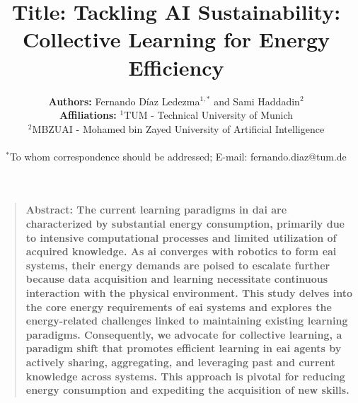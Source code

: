 \documentclass[12pt]{article}
\title{\textbf{Title:} Tackling AI Sustainability: Collective Learning for Energy Efficiency}
\author
{\textbf{Authors:} Fernando D\'iaz Ledezma$ {}^{1,\ast}$ and Sami Haddadin${}^{2}$
	\\
	\normalsize{\textbf{Affiliations:} \normalsize{${}^{1}$TUM - Technical University of Munich}}\\
	\normalsize{${}^{2}$MBZUAI - Mohamed bin Zayed University of Artificial Intelligence}\\
	\\
	\normalsize{$^\ast$To whom correspondence should be addressed; E-mail: fernando.diaz@tum.de}
}
\date{}
\newenvironment{sciabstract}{%
\begin{quote} \bf}
{\end{quote}}
\begin{document}
 

\baselineskip24pt


\maketitle 



\begin{sciabstract}
	\textbf{Abstract:} %
	The current learning paradigms in \ac{dai} are characterized by substantial energy consumption, primarily due to intensive computational processes and limited utilization of acquired knowledge. As \ac{ai} converges with robotics to form \ac{eai} systems, their energy demands are poised to escalate further because data acquisition and learning necessitate continuous interaction with the physical environment. This study delves into the core energy requirements of \ac{eai} systems and explores the energy-related challenges linked to maintaining existing learning paradigms. Consequently, we advocate for collective learning, a paradigm shift that promotes efficient learning in \ac{eai} agents by actively sharing, aggregating, and leveraging past and current knowledge across systems. This approach is pivotal for reducing energy consumption and expediting the acquisition of new skills.
\end{sciabstract}

\end{document}
